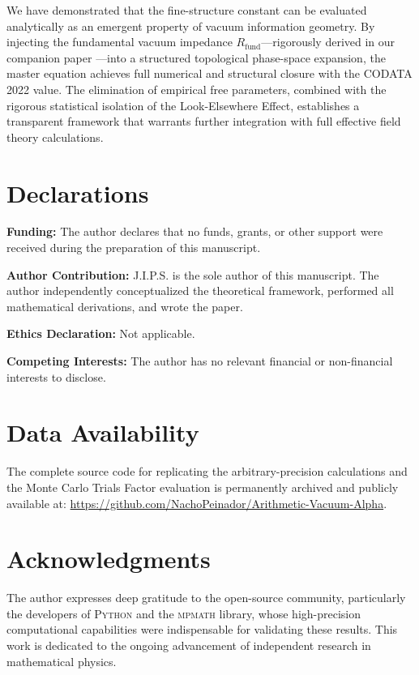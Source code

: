\documentclass[12pt,a4paper]{article}
\begin{document}
We have demonstrated that the fine-structure constant can be evaluated analytically as an emergent property of vacuum information geometry. By injecting the fundamental vacuum impedance $R_{\text{fund}}$—rigorously derived in our companion paper \cite{peinador2026_foundational}—into a structured topological phase-space expansion, the master equation achieves full numerical and structural closure with the CODATA 2022 value. The elimination of empirical free parameters, combined with the rigorous statistical isolation of the Look-Elsewhere Effect, establishes a transparent framework that warrants further integration with full effective field theory calculations.


\section*{Declarations}

\textbf{Funding:} The author declares that no funds, grants, or other support were received during the preparation of this manuscript.

\vspace{0.5em}
\noindent\textbf{Author Contribution:} J.I.P.S. is the sole author of this manuscript. The author independently conceptualized the theoretical framework, performed all mathematical derivations, and wrote the paper.

\vspace{0.5em}
\noindent\textbf{Ethics Declaration:} Not applicable.

\vspace{0.5em}
\noindent\textbf{Competing Interests:} The author has no relevant financial or non-financial interests to disclose.

\section*{Data Availability}
The complete source code for replicating the arbitrary-precision calculations and the Monte Carlo Trials Factor evaluation is permanently archived and publicly available at: \url{https://github.com/NachoPeinador/Arithmetic-Vacuum-Alpha}.

\section*{Acknowledgments}
The author expresses deep gratitude to the open-source community, particularly the developers of \textsc{Python} and the \textsc{mpmath} library, whose high-precision computational capabilities were indispensable for validating these results. This work is dedicated to the ongoing advancement of independent research in mathematical physics.
\end{document}
